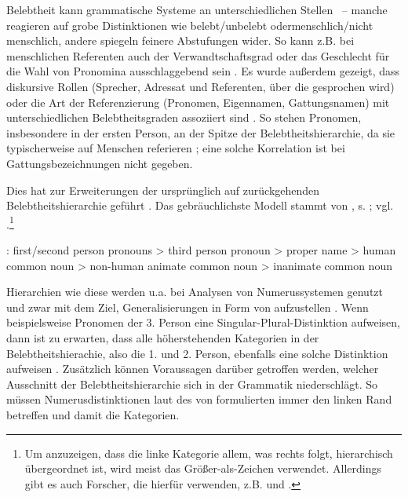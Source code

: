 Belebtheit kann grammatische Systeme an unterschiedlichen Stellen ~-- manche reagieren auf grobe Distinktionen wie belebt/unbelebt oder\linebreak menschlich/nicht menschlich, andere spiegeln feinere Abstufungen wider. So kann z.B. bei menschlichen Referenten auch der Verwandtschaftsgrad oder das Geschlecht für die Wahl von Pronomina ausschlaggebend sein \parencite[s. ausführlich][194--197]{Comrie1989, Corbett2000}. Es wurde außerdem gezeigt, dass diskursive Rollen (Sprecher,  Adressat und Referenten, über die gesprochen wird) oder die Art der Referenzierung (Pronomen, Eigennamen, Gattungsnamen)  mit unterschiedlichen Belebtheitsgraden assoziiert sind \parencite[s. etwa][186]{Comrie1989}. So stehen Pronomen, insbesondere in der ersten Person, an der Spitze der Belebtheitshierarchie,  da sie typischerweise auf Menschen referieren \parencite[s. auch][67]{Fraurud1996}; eine solche Korrelation ist bei Gattungsbezeichnungen nicht gegeben. 

Dies hat zur Erweiterungen der ursprünglich auf \textcite{Silverstein1976} zurückgehenden Belebtheitshierarchie geführt \parencite[vgl. u.a.][]{Allan1987,Langacker1991,Langacker2008,Dixon1995,Corbett2000,Foley2007}. Das gebräuchlichste Modell stammt von \textcite[85]{Dixon1995}, s. ; vgl. \textcite[130]{Croft2006}.\footnote{Um anzuzeigen, dass die linke Kategorie allem, was rechts folgt, hierarchisch übergeordnet ist, wird meist das Größer-als-Zeichen \hervor{>} verwendet. Allerdings gibt es auch Forscher, die hierfür \hervor{<} verwenden, z.B. \textcite{Allan1987} und \textcite{Croft2006}.}  

\begin{exe}
	\ex \label{ex:dixon} : first/second person pronouns > third person pronoun > proper name > human common noun > non-human animate common noun > inanimate common noun
	\end{exe}
\noindent
Hierarchien wie diese werden u.a. bei Analysen von Numerussystemen genutzt \parencite{Corbett2000,Croft2006} und zwar mit dem Ziel, Generalisierungen in Form von  \parencite[2]{Zifonun2006} aufzustellen \parencite[vgl. auch][47]{Dahl1996}. Wenn beispielsweise Pronomen der 3. Person eine Singular-Plural-Distinktion aufweisen, dann ist zu erwarten, dass alle höherstehenden Kategorien in der Belebtheitshierachie, also die 1. und 2. Person, ebenfalls eine solche Distinktion aufweisen \parencite[129]{Croft2006}. Zusätzlich können Voraussagen darüber getroffen werden, welcher Ausschnitt der Belebtheitshierarchie sich in der Grammatik niederschlägt. So müssen Numerusdistinktionen laut des von \textcite[56]{Corbett2000} formulierten  immer den linken Rand betreffen und damit die  Kategorien. 

